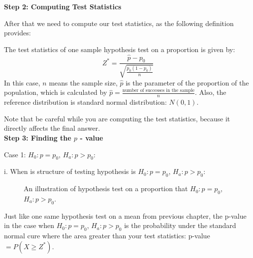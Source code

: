 \textbf{Step 2: Computing Test Statistics}

After that we need to compute our test statistics, as the following definition provides:

\begin{definition}
The test statistics of one sample hypothesis test on a proportion is given by: \[ Z^* = \frac{\hat{p} - p_0}{ \sqrt{ \frac{p_0(1-p_0)}{n} } } \]
In this case, $n$ means the sample size, $\hat{p}$ is the parameter of the proportion of the population, which is calculated by $\hat{p} = \frac{\text{number of successes in the sample}}{n}$. Also, the reference distribution is standard normal distribution: $N(0,1)$.
\end{definition}

Note that be careful while you are computing the test statistics, because it directly affects the final answer.\\

\textbf{Step 3: Finding the $p$ - value}

Case 1: $H_0: p = p_0$, $H_a: p > p_0$:

i. When is structure of testing hypothesis is $H_0: p = p_0$, $H_a: p > p_0$:

\begin{figure}[h]
\begin{center}
\end{center}
\caption{An illustration of hypothesis test on a proportion that $H_0: p = p_0$, $H_a: p > p_0$.}
\end{figure}

Just like one same hypothesis test on a mean from previous chapter, the p-value in the case when $H_0: p = p_0$, $H_a: p > p_0$ is the probability under the standard normal cure where the area greater than your test statistics: p-value $= P(X \ge Z^*)$.\\

